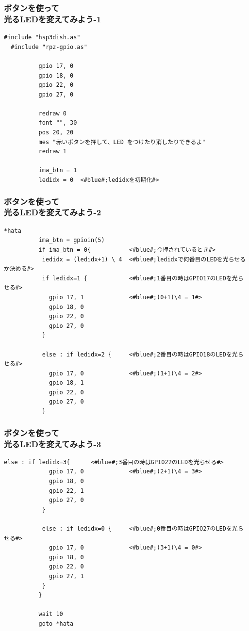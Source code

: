 \documentclass[slide03.tex]{subfiles}
\begin{document}
\begin{frame}[fragile]
  \frametitle{ボタンを使って\\光るLEDを変えてみよう-1}
  \begin{lstlisting}[title=\sim/03/button\_led3.hsp 前半, label=button_led3.hsp-1]
  #include "hsp3dish.as"
  #include "rpz-gpio.as"
  
          gpio 17, 0   
          gpio 18, 0
          gpio 22, 0
          gpio 27, 0

          redraw 0
          font "", 30
          pos 20, 20
          mes "赤いボタンを押して、LED をつけたり消したりできるよ"
          redraw 1

          ima_btn = 1 
          ledidx = 0  <#blue#;ledidxを初期化#>
  \end{lstlisting}
\end{frame}

\begin{frame}[fragile]
  \frametitle{ボタンを使って\\光るLEDを変えてみよう-2}
  \begin{lstlisting}[title=\sim/03/button\_led3.hsp 中盤, label=button_led3.hsp-2]
  *hata
          ima_btn = gpioin(5)
          if ima_btn = 0{           <#blue#;今押されているとき#>
           iedidx = (ledidx+1) \ 4  <#blue#;ledidxで何番目のLEDを光らせるか決める#>
           if ledidx=1 {            <#blue#;1番目の時はGPIO17のLEDを光らせる#>
             gpio 17, 1             <#blue#;(0+1)\4 = 1#>
             gpio 18, 0 
             gpio 22, 0
             gpio 27, 0
           }

           else : if ledidx=2 {     <#blue#;2番目の時はGPIO18のLEDを光らせる#>
             gpio 17, 0             <#blue#;(1+1)\4 = 2#>
             gpio 18, 1
             gpio 22, 0
             gpio 27, 0
           }
  \end{lstlisting}
\end{frame}

\begin{frame}[fragile]
  \frametitle{ボタンを使って\\光るLEDを変えてみよう-3}
  \begin{lstlisting}[title=button\_led3.hsp 後半, label=button_led3.hsp-3]
           else : if ledidx=3{      <#blue#;3番目の時はGPIO22のLEDを光らせる#>
             gpio 17, 0             <#blue#;(2+1)\4 = 3#>
             gpio 18, 0
             gpio 22, 1
             gpio 27, 0
           }

           else : if ledidx=0 {     <#blue#;0番目の時はGPIO27のLEDを光らせる#>
             gpio 17, 0             <#blue#;(3+1)\4 = 0#>
             gpio 18, 0
             gpio 22, 0
             gpio 27, 1
           }
          }

          wait 10
          goto *hata
  \end{lstlisting}
\end{frame}
\end{document}

